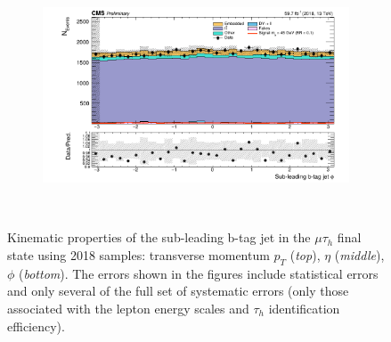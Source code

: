 \begin{figure}[ht]
\begin{subfigure}{0.75\textwidth}
    \end{subfigure} \\
    \begin{subfigure}{0.75\textwidth}
        \includegraphics[width=1.0\textwidth]{figures/ch-11-asymmetric/mutau_bphi_deepflavour_2.png}
    \end{subfigure} \\       
    \caption{Kinematic properties of the sub-leading b-tag jet in the $\mu\tau_{h}$ final state using 2018 samples: transverse momentum $p_{T}$ (\textit{top}), $\eta$ (\textit{middle}), $\phi$ (\textit{bottom}). The errors shown in the figures include statistical errors and only several of the full set of systematic errors (only those associated with the lepton energy scales and $\tau_{h}$ identification efficiency).}
    \label{fig:nanoAOD_mutau_control_plots_btagjets_subleading}
\end{figure}


